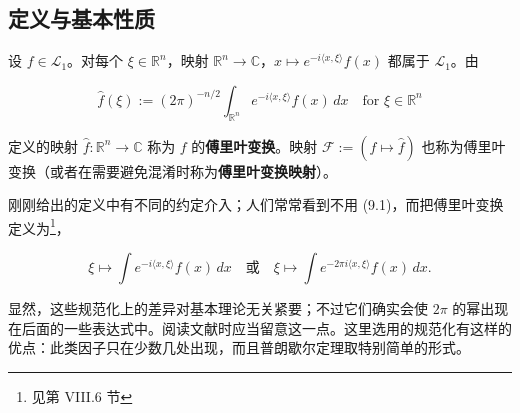 \subsection*{定义与基本性质}

设 $ f \in \mathcal{L}_1 $。对每个 $ \xi \in \mathbb{R}^n $，映射 $ \mathbb{R}^n \to \mathbb{C} $，$ x \mapsto e^{-i\langle x,\xi\rangle}f(x) $ 都属于 $ \mathcal{L}_1 $。由

\begin{equation}
\hat{f}(\xi) := (2\pi)^{-n/2}\int_{\mathbb{R}^n} e^{-i\langle x,\xi\rangle} f(x)\,dx \quad \text{for } \xi \in \mathbb{R}^n\tag{9.1}
\end{equation}

定义的映射 $ \hat{f}: \mathbb{R}^n \to \mathbb{C} $ 称为 $ f $ 的\textbf{傅里叶变换}。映射 $ \mathcal{F} := (f \mapsto \hat{f}) $ 也称为傅里叶变换（或者在需要避免混淆时称为\textbf{傅里叶变换映射}）。

刚刚给出的定义中有不同的约定介入；人们常常看到不用 (9.1)，而把傅里叶变换定义为\footnote{见第 VIII.6 节}，

\[
\xi \mapsto \int e^{-i\langle x,\xi\rangle} f(x)\,dx \quad \text{或} \quad \xi \mapsto \int e^{-2\pi i\langle x,\xi\rangle} f(x)\,dx .
\]

显然，这些规范化上的差异对基本理论无关紧要；不过它们确实会使 $ 2\pi $ 的幂出现在后面的一些表达式中。阅读文献时应当留意这一点。这里选用的规范化有这样的优点：此类因子只在少数几处出现，而且普朗歇尔定理取特别简单的形式。

